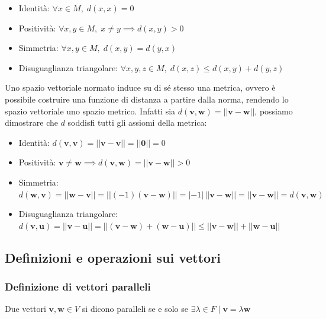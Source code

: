 \documentclass{article}
\begin{document}
    \begin{itemize}
        \item Identità: $\forall x \in M, \; d(x, x) = 0$
        \item Positività: $\forall x, y \in M, \; x \neq y \implies d(x, y) > 0$
        \item Simmetria: $\forall x, y \in M, \; d(x, y) = d(y, x)$
        \item Disuguaglianza triangolare: $\forall x, y, z \in M, \; d(x, z) \leq d(x, y) + d(y, z)$
    \end{itemize}

    Uno spazio vettoriale normato induce su di sé stesso una metrica, ovvero è possibile costruire una funzione di distanza a partire dalla norma, rendendo lo spazio vettoriale uno spazio metrico.
    Infatti sia $d(\mathbf{v}, \mathbf{w}) = ||\mathbf{v} - \mathbf{w}||$, possiamo dimostrare che $d$ soddisfi tutti gli assiomi della metrica:

    \begin{itemize}
        \item Identità: $d(\mathbf{v}, \mathbf{v}) = ||\mathbf{v} - \mathbf{v}|| = ||\mathbf{0}|| = 0$ 
        \item Positività: $\mathbf{v} \neq \mathbf{w} \implies d(\mathbf{v}, \mathbf{w}) = ||\mathbf{v} - \mathbf{w}|| > 0$
        \item Simmetria: $d(\mathbf{w}, \mathbf{v}) = ||\mathbf{w} - \mathbf{v}|| = ||(-1)(\mathbf{v} - \mathbf{w})|| = |-1|\,||\mathbf{v} - \mathbf{w}|| = ||\mathbf{v} - \mathbf{w}|| = d(\mathbf{v}, \mathbf{w})$ 
        \item Disuguaglianza triangolare: $d(\mathbf{v}, \mathbf{u}) = ||\mathbf{v} - \mathbf{u}|| = ||(\mathbf{v} - \mathbf{w}) + (\mathbf{w} - \mathbf{u})|| \leq ||\mathbf{v} - \mathbf{w}|| + ||\mathbf{w} - \mathbf{u}||$
    \end{itemize}

\vspace{10pt}
\subsection{Definizioni e operazioni sui vettori} \label{subsec:vsoperations}
    \subsubsection{Definizione di vettori paralleli} \label{subsubsec:vsparallel}
        Due vettori $\mathbf{v}, \mathbf{w} \in V$ si dicono paralleli se e solo se $\exists \lambda \in F \; | \; \mathbf{v} = \lambda \mathbf{w}$  
\end{document}
